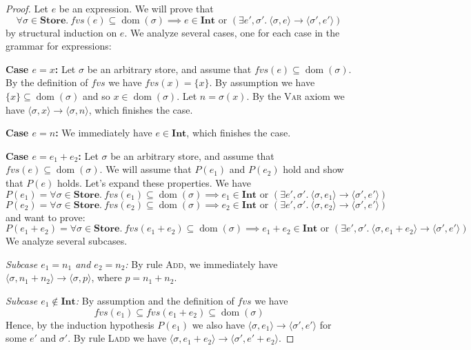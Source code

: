 \documentclass[11pt]{article}
\begin{document}
\begin{proof}
Let $e$ be an expression. We will prove that
\[
\forall \sigma \in \mathbf{Store}.\ fvs(e) \subseteq \operatorname{dom}(\sigma) \implies e \in
\mathbf{Int} \text{ or } (\exists e', \sigma'.\ \langle \sigma, e \rangle \to \langle \sigma',
e' \rangle)
\]
by structural induction on $e$. We analyze several cases, one for each case in the grammar for
expressions:

\medskip
\noindent\textbf{Case $e = x$:} Let $\sigma$ be an arbitrary store, and assume that $fvs(e)
\subseteq \operatorname{dom}(\sigma)$. By the definition of $fvs$ we have $fvs(x) = \{x\}$. By
assumption we have $\{x\} \subseteq \operatorname{dom}(\sigma)$ and so $x \in
\operatorname{dom}(\sigma)$. Let $n = \sigma(x)$. By the \textsc{Var} axiom we have $\langle
\sigma, x \rangle \to \langle \sigma, n \rangle$, which finishes the case.

\medskip
\noindent\textbf{Case $e = n$:} We immediately have $e \in \mathbf{Int}$, which finishes the
case.

\medskip
\noindent\textbf{Case $e = e_1 + e_2$:} Let $\sigma$ be an arbitrary store, and assume that
$fvs(e) \subseteq \operatorname{dom}(\sigma)$. We will assume that $P(e_1)$ and $P(e_2)$ hold
and show that $P(e)$ holds. Let's expand these properties. We have
\[
P(e_1) = \forall \sigma \in \mathbf{Store}.\ fvs(e_1) \subseteq \operatorname{dom}(\sigma)
\implies e_1 \in \mathbf{Int} \text{ or } (\exists e', \sigma'.\ \langle \sigma, e_1 \rangle \to
\langle \sigma', e' \rangle)
\]
\[
P(e_2) = \forall \sigma \in \mathbf{Store}.\ fvs(e_2) \subseteq \operatorname{dom}(\sigma)
\implies e_2 \in \mathbf{Int} \text{ or } (\exists e', \sigma'.\ \langle \sigma, e_2 \rangle \to
\langle \sigma', e' \rangle)
\]
and want to prove:
\[
P(e_1 + e_2) = \forall \sigma \in \mathbf{Store}.\ fvs(e_1+e_2) \subseteq
\operatorname{dom}(\sigma) \implies e_1 + e_2 \in \mathbf{Int} \text{ or } (\exists e',
\sigma'.\ \langle \sigma, e_1 + e_2 \rangle \to \langle \sigma', e' \rangle)
\]
We analyze several subcases.

\smallskip
\noindent\textit{Subcase $e_1 = n_1$ and $e_2 = n_2$:} By rule \textsc{Add}, we immediately have
$\langle \sigma, n_1 + n_2 \rangle \to \langle \sigma, p \rangle$, where $p = n_1 + n_2$.

\smallskip
\noindent\textit{Subcase $e_1 \notin \mathbf{Int}$:} By assumption and the definition of $fvs$
we have
\[
fvs(e_1) \subseteq fvs(e_1 + e_2) \subseteq \operatorname{dom}(\sigma)
\]
Hence, by the induction hypothesis $P(e_1)$ we also have $\langle \sigma, e_1 \rangle \to
\langle \sigma', e' \rangle$ for some $e'$ and $\sigma'$. By rule \textsc{Ladd} we have $\langle
\sigma, e_1 + e_2 \rangle \to \langle \sigma', e' + e_2 \rangle$.


\end{proof}
\end{document}
